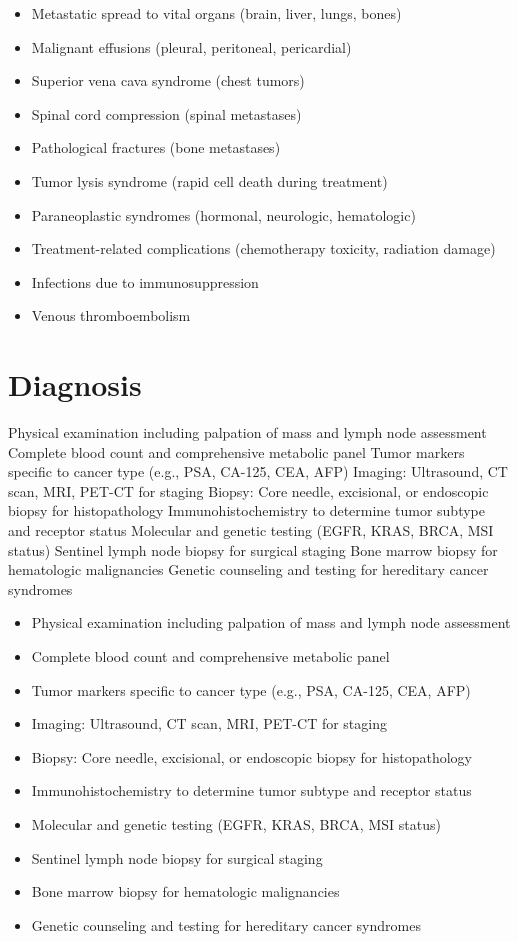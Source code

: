\begin{itemize}[noitemsep]
  \item Metastatic spread to vital organs (brain, liver, lungs, bones)
  \item Malignant effusions (pleural, peritoneal, pericardial)
  \item Superior vena cava syndrome (chest tumors)
  \item Spinal cord compression (spinal metastases)
  \item Pathological fractures (bone metastases)
  \item Tumor lysis syndrome (rapid cell death during treatment)
  \item Paraneoplastic syndromes (hormonal, neurologic, hematologic)
  \item Treatment-related complications (chemotherapy toxicity, radiation damage)
  \item Infections due to immunosuppression
  \item Venous thromboembolism
\end{itemize}
\section{Diagnosis}
Physical examination including palpation of mass and lymph node assessment Complete blood count and comprehensive metabolic panel Tumor markers specific to cancer type (e.g., PSA, CA-125, CEA, AFP) Imaging: Ultrasound, CT scan, MRI, PET-CT for staging Biopsy: Core needle, excisional, or endoscopic biopsy for histopathology Immunohistochemistry to determine tumor subtype and receptor status Molecular and genetic testing (EGFR, KRAS, BRCA, MSI status) Sentinel lymph node biopsy for surgical staging Bone marrow biopsy for hematologic malignancies Genetic counseling and testing for hereditary cancer syndromes

\begin{itemize}[noitemsep]
  \item Physical examination including palpation of mass and lymph node assessment
  \item Complete blood count and comprehensive metabolic panel
  \item Tumor markers specific to cancer type (e.g., PSA, CA-125, CEA, AFP)
  \item Imaging: Ultrasound, CT scan, MRI, PET-CT for staging
  \item Biopsy: Core needle, excisional, or endoscopic biopsy for histopathology
  \item Immunohistochemistry to determine tumor subtype and receptor status
  \item Molecular and genetic testing (EGFR, KRAS, BRCA, MSI status)
  \item Sentinel lymph node biopsy for surgical staging
  \item Bone marrow biopsy for hematologic malignancies
  \item Genetic counseling and testing for hereditary cancer syndromes
\end{itemize}

